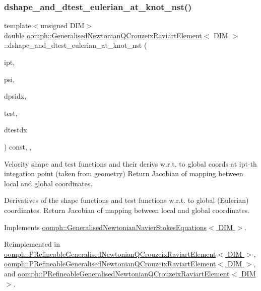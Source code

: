 \subsubsection{\texorpdfstring{dshape\+\_\+and\+\_\+dtest\+\_\+eulerian\+\_\+at\+\_\+knot\+\_\+nst()}{dshape\_and\_dtest\_eulerian\_at\_knot\_nst()}\hspace{0.1cm}{\footnotesize\ttfamily [1/4]}}
{\footnotesize\ttfamily template$<$unsigned D\+IM$>$ \\
double \hyperlink{classoomph_1_1GeneralisedNewtonianQCrouzeixRaviartElement}{oomph\+::\+Generalised\+Newtonian\+Q\+Crouzeix\+Raviart\+Element}$<$ D\+IM $>$\+::dshape\+\_\+and\+\_\+dtest\+\_\+eulerian\+\_\+at\+\_\+knot\+\_\+nst (\begin{DoxyParamCaption}\item[{const unsigned \&}]{ipt,  }\item[{\hyperlink{classoomph_1_1Shape}{Shape} \&}]{psi,  }\item[{\hyperlink{classoomph_1_1DShape}{D\+Shape} \&}]{dpsidx,  }\item[{\hyperlink{classoomph_1_1Shape}{Shape} \&}]{test,  }\item[{\hyperlink{classoomph_1_1DShape}{D\+Shape} \&}]{dtestdx }\end{DoxyParamCaption}) const\hspace{0.3cm}{\ttfamily [inline]}, {\ttfamily [protected]}, {\ttfamily [virtual]}}



Velocity shape and test functions and their derivs w.\+r.\+t. to global coords at ipt-\/th integation point (taken from geometry) Return Jacobian of mapping between local and global coordinates. 

Derivatives of the shape functions and test functions w.\+r.\+t. to global (Eulerian) coordinates. Return Jacobian of mapping between local and global coordinates. 

Implements \hyperlink{classoomph_1_1GeneralisedNewtonianNavierStokesEquations_a20efdbf511d69c1176c6b3df4dfc5fb3}{oomph\+::\+Generalised\+Newtonian\+Navier\+Stokes\+Equations$<$ D\+I\+M $>$}.



Reimplemented in \hyperlink{classoomph_1_1PRefineableGeneralisedNewtonianQCrouzeixRaviartElement_a7c700df3e0225e2b5a26441730f5fb51}{oomph\+::\+P\+Refineable\+Generalised\+Newtonian\+Q\+Crouzeix\+Raviart\+Element$<$ D\+I\+M $>$}, \hyperlink{classoomph_1_1PRefineableGeneralisedNewtonianQCrouzeixRaviartElement_a7b223143f207155ce82ddaec2d2d7e1e}{oomph\+::\+P\+Refineable\+Generalised\+Newtonian\+Q\+Crouzeix\+Raviart\+Element$<$ D\+I\+M $>$}, and \hyperlink{classoomph_1_1PRefineableGeneralisedNewtonianQCrouzeixRaviartElement_a203b2ab3f584e3283f793724b13f1838}{oomph\+::\+P\+Refineable\+Generalised\+Newtonian\+Q\+Crouzeix\+Raviart\+Element$<$ D\+I\+M $>$}.



